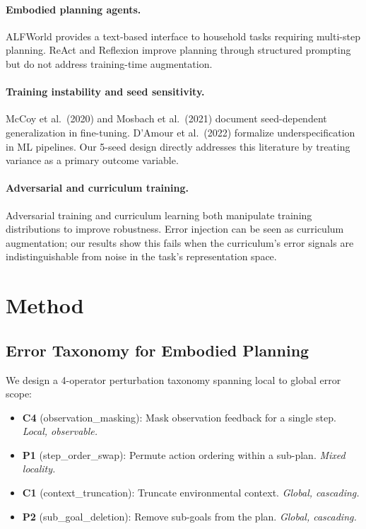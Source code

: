 \documentclass[11pt,a4paper]{article}
\begin{document}
\paragraph{Embodied planning agents.} ALFWorld \citep{shridhar2021alfworld} provides a text-based interface to household tasks requiring multi-step planning. ReAct \citep{yao2023react} and Reflexion \citep{shinn2023reflexion} improve planning through structured prompting but do not address training-time augmentation.

\paragraph{Training instability and seed sensitivity.} McCoy et al.\ (2020) and Mosbach et al.\ (2021) document seed-dependent generalization in fine-tuning. D'Amour et al.\ (2022) formalize underspecification in ML pipelines. Our 5-seed design directly addresses this literature by treating variance as a primary outcome variable.

\paragraph{Adversarial and curriculum training.} Adversarial training \citep{madry2018towards} and curriculum learning \citep{bengio2009curriculum} both manipulate training distributions to improve robustness. Error injection can be seen as curriculum augmentation; our results show this fails when the curriculum's error signals are indistinguishable from noise in the task's representation space.

\section{Method}

\subsection{Error Taxonomy for Embodied Planning}

We design a 4-operator perturbation taxonomy spanning local to global error scope:

\begin{itemize}
    \item \textbf{C4} (observation\_masking): Mask observation feedback for a single step. \emph{Local, observable.}
    \item \textbf{P1} (step\_order\_swap): Permute action ordering within a sub-plan. \emph{Mixed locality.}
    \item \textbf{C1} (context\_truncation): Truncate environmental context. \emph{Global, cascading.}
    \item \textbf{P2} (sub\_goal\_deletion): Remove sub-goals from the plan. \emph{Global, cascading.}
\end{itemize}
\end{document}
